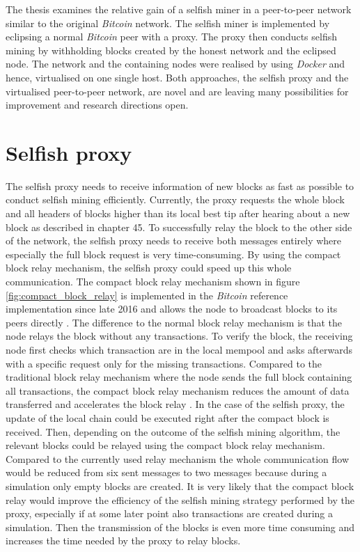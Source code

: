 The thesis examines the relative gain of a selfish miner in a peer-to-peer network similar to the original \textit{Bitcoin} network.
The selfish miner is implemented by eclipsing a normal \textit{Bitcoin} peer with a proxy.
The proxy then conducts selfish mining by withholding blocks created by the honest network and the eclipsed node.
The network and the containing nodes were realised by using \textit{Docker} and hence, virtualised on one single host.
Both approaches, the selfish proxy and the virtualised peer-to-peer network, are novel and are leaving many possibilities for improvement and research directions open.

\section{Selfish proxy}

The selfish proxy needs to receive information of new blocks as fast as possible to conduct selfish mining efficiently.
Currently, the proxy requests the whole block and all headers of blocks higher than its local best tip after hearing about a new block as described in chapter 45.
To successfully relay the block to the other side of the network, the selfish proxy needs to receive both messages entirely where especially the full block request is very time-consuming.
By using the compact block relay mechanism, the selfish proxy could speed up this whole communication.
The compact block relay mechanism shown in figure \ref{fig:compact_block_relay} is implemented in the \textit{Bitcoin} reference implementation since late 2016 \cite{bitcoinrelease13} and allows the node to broadcast blocks to its peers directly \cite{bip152}.
The difference to the normal block relay mechanism is that the node relays the block without any transactions.
To verify the block, the receiving node first checks which transaction are in the local mempool and asks afterwards with a specific request only for the missing transactions.
Compared to the traditional block relay mechanism where the node sends the full block containing all transactions, the compact block relay mechanism reduces the amount of data transferred and accelerates the block relay \cite{bip152, ozisik2017graphene}.
In the case of the selfish proxy, the update of the local chain could be executed right after the compact block is received.
Then, depending on the outcome of the selfish mining algorithm, the relevant blocks could be relayed using the compact block relay mechanism.
Compared to the currently used relay mechanism the whole communication flow would be reduced from six sent messages to two messages because during a simulation only empty blocks are created.
It is very likely that the compact block relay would improve the efficiency of the selfish mining strategy performed by the proxy, especially if at some later point also transactions are created during a simulation.
Then the transmission of the blocks is even more time consuming and increases the time needed by the proxy to relay blocks.

